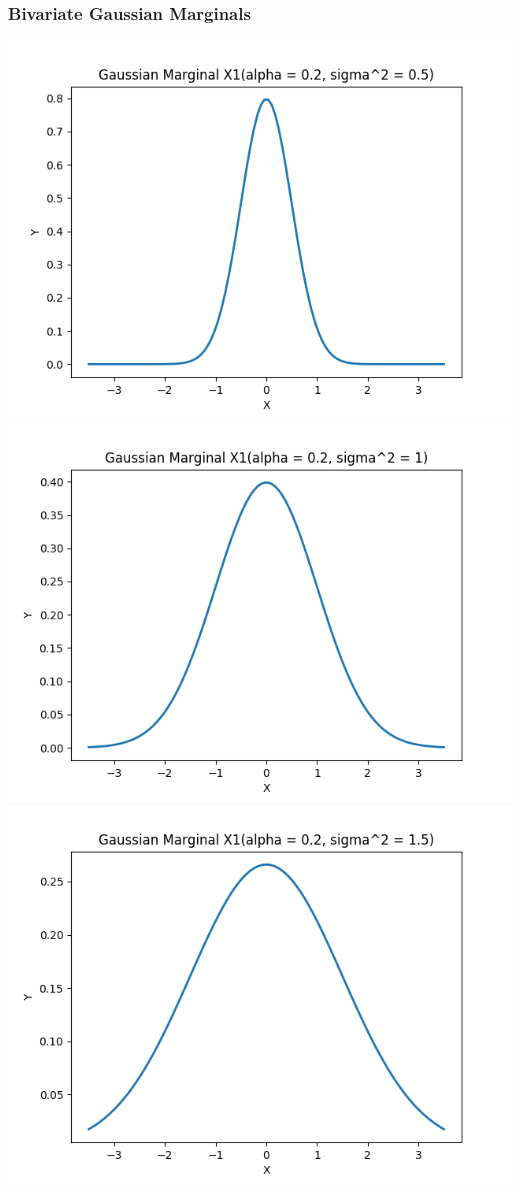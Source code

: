 \documentclass{article}
\begin{document}
\subsubsection{Bivariate Gaussian Marginals}
\includegraphics[width=\linewidth]{X1(alpha = 0.2, sigma^2 = 0.5).png}
\includegraphics[width=\linewidth]{X1(alpha = 0.2, sigma^2 = 1).png}
\includegraphics[width=\linewidth]{X1(alpha = 0.2, sigma^2 = 1.5).png}
\end{document}
